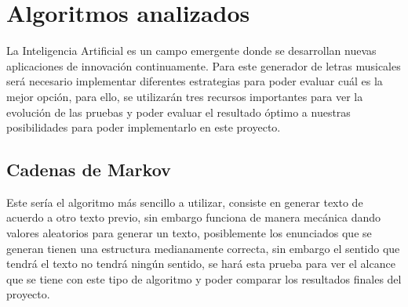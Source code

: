 \documentclass[12pt, a4paper, titlepage]{report}
\begin{document}
	   	\section{Algoritmos analizados} %
	   	La Inteligencia Artificial es un campo emergente donde se desarrollan nuevas aplicaciones de innovación continuamente.
	   	Para este generador de letras musicales será necesario implementar diferentes estrategias para poder evaluar cuál es la mejor opción, para ello, se utilizarán tres recursos importantes para ver la evolución de las pruebas y poder evaluar el resultado óptimo a nuestras posibilidades para poder implementarlo en este proyecto.
	   	
	   	\subsection{Cadenas de Markov}
	   	Este sería el algoritmo más sencillo a utilizar, consiste en generar texto de acuerdo a otro texto previo, sin embargo funciona de manera mecánica dando valores aleatorios para generar un texto, posiblemente los enunciados que se generan tienen una estructura medianamente correcta, sin embargo el sentido que tendrá el texto no tendrá ningún sentido, se hará esta prueba para ver el alcance que se tiene con este tipo de algoritmo y poder comparar los resultados finales del proyecto. 
	   	
\end{document}
